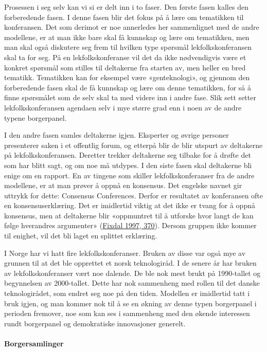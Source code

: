 \documentclass[
  12pt,
  a4paper, 12pt]{article}
\begin{document}
Prosessen i seg selv kan vi si er delt inn i to faser. Den første fasen kalles den forberedende fasen. I denne fasen blir det fokus på å lære om tematikken til konferansen. Det som derimot er noe annerledes her sammenlignet med de andre modellene, er at man ikke bare skal få kunnskap og lære om tematikken, men man skal også diskutere seg frem til hvilken type spørsmål lekfolkskonferansen skal ta for seg. På en lekfolkskonferanse vil det da ikke nødvendigvis være et konkret spørsmål som stilles til deltakerne fra starten av, men heller en bred tematikk. Tematikken kan for eksempel være «genteknologi», og gjennom den forberedende fasen skal de få kunnskap og lære om denne tematikken, for så å finne spørsmålet som de selv skal ta med videre inn i andre fase. Slik sett setter lekfolkskonferansen agendaen selv i mye større grad enn i noen av de andre typene borgerpanel.

I den andre fasen samles deltakerne igjen. Eksperter og øvrige personer presenterer saken i et offentlig forum, og etterpå blir de blir utspurt av deltakerne på lekfolkskonferansen. Deretter trekker deltakerne seg tilbake for å drøfte det som har blitt sagt, og om noe må utdypes. I den siste fasen skal deltakerne bli enige om en rapport. En av tingene som skiller lekfolkskonferanser fra de andre modellene, er at man prøver å oppnå en konsensus. Det engelske navnet gir uttrykk for dette: Consensus Conferences. Derfor er resultatet av konferansen ofte en konsensuserklæring. Det er imidlertid viktig at det ikke er tvang for å oppnå konsensus, men at deltakerne blir «oppmuntret til å utforske hvor langt de kan følge hverandres argumenter» (\protect\hyperlink{ref-fixdal_consensus_1997}{Fixdal 1997, 370}). Dersom gruppen ikke kommer til enighet, vil det bli laget en splittet erklæring.

I Norge har vi hatt fire lekfolkskonferanser. Bruken av disse var også mye av grunnen til at det ble opprettet et norsk teknologiråd.
I de senere år har bruken av lekfolkskonferanser vært noe dalende. De ble nok mest brukt på 1990-tallet og begynnelsen av 2000-tallet. Dette har nok sammenheng med rollen til det danske teknologirådet, som endret seg noe på den tiden. Modellen er imidlertid tatt i bruk igjen, og man kommer nok til å se en økning av denne typen borgerpanel i perioden fremover, noe som kan ses i sammenheng med den økende interessen rundt borgerpanel og demokratiske innovasjoner generelt.

\hypertarget{borgersamlinger}{%
\paragraph{Borgersamlinger}\label{borgersamlinger}}
\end{document}
